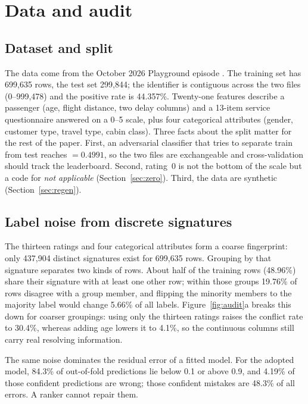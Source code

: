 \section{Data and audit}
\label{sec:data}

\subsection{Dataset and split}
The data come from the October 2026 Playground episode \citep{kaggle_s6e10}.
The training set has 699{,}635 rows, the test set 299{,}844; the identifier is contiguous
across the two files (0--999{,}478) and the positive rate is 44.357\%. Twenty-one features
describe a passenger (age, flight distance, two delay columns) and a 13-item service
questionnaire answered on a 0--5 scale, plus four categorical attributes
(gender, customer type, travel type, cabin class). Three facts about the split matter for the
rest of the paper. First, an adversarial classifier that tries to separate train from test
reaches \auc{} $=0.4991$, so the two files are exchangeable and cross-validation should track
the leaderboard. Second, rating~0 is not the bottom of the scale but a code for
\emph{not applicable} (Section~\ref{sec:zero}). Third, the data are synthetic
(Section~\ref{sec:regen}).

\subsection{Label noise from discrete signatures}
\label{sec:noise}
The thirteen ratings and four categorical attributes form a coarse fingerprint: only
437{,}904 distinct signatures exist for 699{,}635 rows. Grouping by that signature separates
two kinds of rows. About half of the training rows (48.96\%) share their signature with at
least one other row; within those groups 19.76\% of rows disagree with a group member, and
flipping the minority members to the majority label would change 5.66\% of all labels.
Figure~\ref{fig:audit}a breaks this down for coarser groupings: using only the thirteen ratings
raises the conflict rate to 30.4\%, whereas adding age lowers it to 4.1\%, so the continuous
columns still carry real resolving information.

The same noise dominates the residual error of a fitted model. For the adopted model, 84.3\% of
out-of-fold predictions lie below 0.1 or above 0.9, and 4.19\% of those confident predictions
are wrong; those confident mistakes are 48.3\% of all errors. A ranker cannot repair them.

